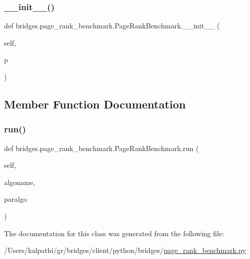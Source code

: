 \subsubsection{\texorpdfstring{\+\_\+\+\_\+init\+\_\+\+\_\+()}{\_\_init\_\_()}}
{\footnotesize\ttfamily def bridges.\+page\+\_\+rank\+\_\+benchmark.\+Page\+Rank\+Benchmark.\+\_\+\+\_\+init\+\_\+\+\_\+ (\begin{DoxyParamCaption}\item[{}]{self,  }\item[{}]{p }\end{DoxyParamCaption})}



\subsection{Member Function Documentation}
\mbox{\label{classbridges_1_1page__rank__benchmark_1_1_page_rank_benchmark_ab1e8da6b9ec3e3858f23bcffb42c5f6c}} 
\subsubsection{\texorpdfstring{run()}{run()}}
{\footnotesize\ttfamily def bridges.\+page\+\_\+rank\+\_\+benchmark.\+Page\+Rank\+Benchmark.\+run (\begin{DoxyParamCaption}\item[{}]{self,  }\item[{}]{algoname,  }\item[{}]{paralgo }\end{DoxyParamCaption})}



The documentation for this class was generated from the following file\+:\begin{DoxyCompactItemize}
\item 
/\+Users/kalpathi/gr/bridges/client/python/bridges/\mbox{\hyperlink{page__rank__benchmark_8py}{page\+\_\+rank\+\_\+benchmark.\+py}}\end{DoxyCompactItemize}
